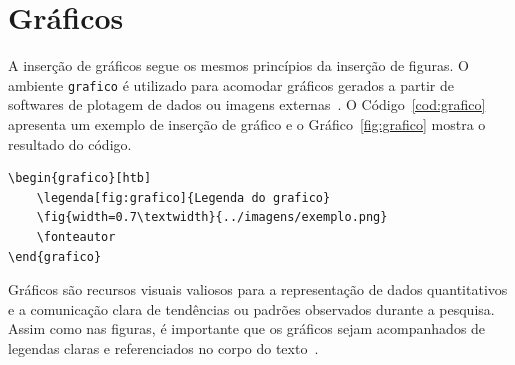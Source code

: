 \documentclass[
    12pt
    ,oneside
    ,a4paper
    ,chapter=TITLE
    ,section=TITLE
    ,sumario=abnt-6027-2012]{abntex2}
\begin{document}
\begin{figure}[htb]
    \hfil
    \hfil

    \hfil
    \hfil
\end{figure}

\section{Gráficos}

A inserção de gráficos segue os mesmos princípios da inserção de figuras. O ambiente \texttt{grafico} é utilizado para acomodar gráficos gerados a partir de softwares de plotagem de dados ou imagens externas~\cite{mittelbach2004latex}. O Código~\ref{cod:grafico} apresenta um exemplo de inserção de gráfico e o Gráfico~\ref{fig:grafico} mostra o resultado do código.

\begin{codigo}[htb]
\begin{lstlisting}
\begin{grafico}[htb]
    \legenda[fig:grafico]{Legenda do grafico}
    \fig{width=0.7\textwidth}{../imagens/exemplo.png}
    \fonteautor
\end{grafico}
\end{lstlisting}
\fonteautor
\end{codigo}

\begin{grafico}[htb]
\end{grafico}

Gráficos são recursos visuais valiosos para a representação de dados quantitativos e a comunicação clara de tendências ou padrões observados durante a pesquisa. Assim como nas figuras, é importante que os gráficos sejam acompanhados de legendas claras e referenciados no corpo do texto~\cite{tufte1990envisioning}.
\end{document}
